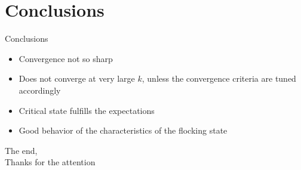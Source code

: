 \documentclass{beamer}
\begin{document}
\section{Conclusions}
\begin{frame}{Conclusions}
	\begin{itemize}
		\item Convergence not so sharp
		\vspace{0.5cm}
		\item Does not converge at very large $k$, unless the convergence criteria are tuned accordingly
		\vspace{0.5cm}
		\item Critical state fulfills the expectations
		\vspace{0.5cm}
		\item Good behavior of the characteristics of the flocking state
	\end{itemize}
\end{frame}

\begin{frame}{}
	The end,\\
	Thanks for the attention
\end{frame}
\end{document}
